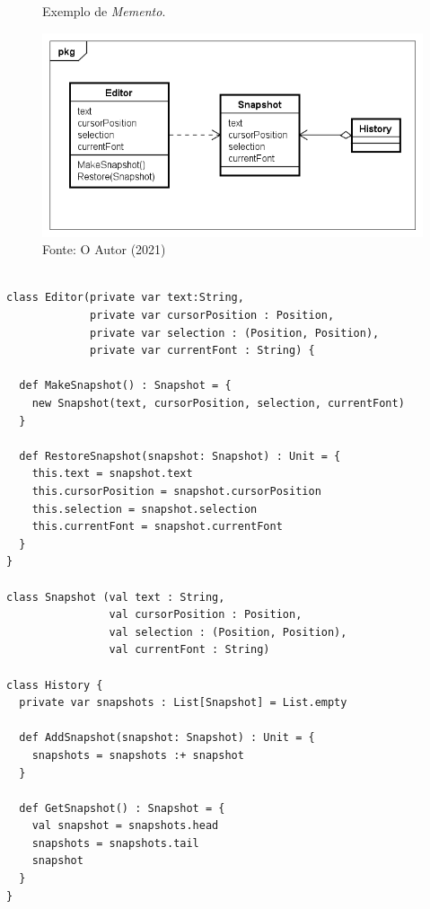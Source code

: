 \begin{figure}[htb]
	\caption{\label{memento_exemplo}Exemplo de \textit{Memento}.}
	\begin{center}
	    \includegraphics[scale=0.5]{5_padroes-contexto-funcional/5.3_comportamentais/5.3.06_memento/memento_exemplo.png}
	\end{center}
  \caption*{Fonte: O Autor (2021)}
\end{figure}

\begin{lstlisting}[caption={\textit{Memento} Orientação a Objetos.},label=oomemento]

class Editor(private var text:String,
             private var cursorPosition : Position,
             private var selection : (Position, Position),
             private var currentFont : String) {

  def MakeSnapshot() : Snapshot = {
    new Snapshot(text, cursorPosition, selection, currentFont)
  }

  def RestoreSnapshot(snapshot: Snapshot) : Unit = {
    this.text = snapshot.text
    this.cursorPosition = snapshot.cursorPosition
    this.selection = snapshot.selection
    this.currentFont = snapshot.currentFont
  }
}

class Snapshot (val text : String,
                val cursorPosition : Position,
                val selection : (Position, Position),
                val currentFont : String)
                
class History {
  private var snapshots : List[Snapshot] = List.empty

  def AddSnapshot(snapshot: Snapshot) : Unit = {
    snapshots = snapshots :+ snapshot
  }

  def GetSnapshot() : Snapshot = {
    val snapshot = snapshots.head
    snapshots = snapshots.tail
    snapshot
  }
}

\end{lstlisting}

